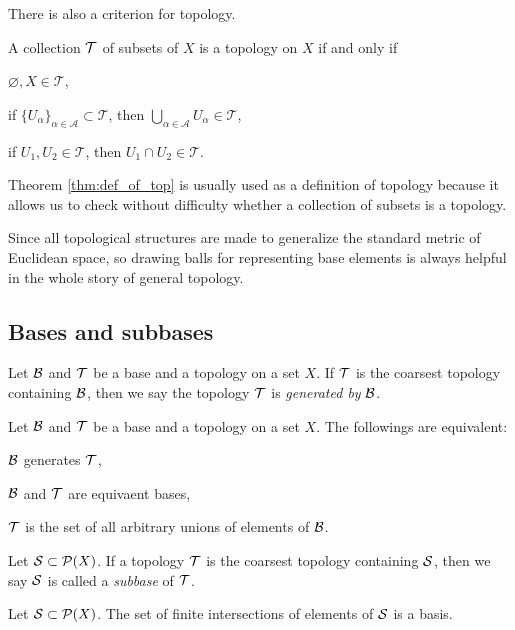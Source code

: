 \documentclass{../crs}
\begin{document}
There is also a criterion for topology.

\begin{thm}\label{thm:def_of_top}
A collection $\mathcal{T}$ of subsets of $X$ is a topology on $X$ if and only if
\begin{cond}
\item $\varnothing,X\in\mathcal{T}$,
\item if $\{U_\alpha\}_{\alpha\in\mathcal{A}}\subset\mathcal{T}$, then $\bigcup_{\alpha\in\mathcal{A}}U_\alpha\in\mathcal{T}$,
\item if $U_1,U_2\in\mathcal{T}$, then $U_1\cap U_2\in\mathcal{T}$.
\end{cond}
\end{thm}
\begin{pf}
\end{pf}
Theorem \ref{thm:def_of_top} is usually used as a definition of topology because it allows us to check without difficulty whether a collection of subsets is a topology.


Since all topological structures are made to generalize the standard metric of Euclidean space, so drawing balls for representing base elements is always helpful in the whole story of general topology.






\subsection{Bases and subbases}

\begin{defn}
Let $\mathcal{B}$ and $\mathcal{T}$ be a base and a topology on a set $X$.
If $\mathcal{T}$ is the coarsest topology containing $\mathcal{B}$, then we say the topology $\mathcal{T}$ is \emph{generated by} $\mathcal{B}$.
\end{defn}
\begin{thm}
Let $\mathcal{B}$ and $\mathcal{T}$ be a base and a topology on a set $X$.
The followings are equivalent:
\begin{cond}
\item $\mathcal{B}$ generates $\mathcal{T}$,
\item $\mathcal{B}$ and $\mathcal{T}$ are equivaent bases,
\item $\mathcal{T}$ is the set of all arbitrary unions of elements of $\mathcal{B}$.
\end{cond}
\end{thm}

\begin{defn}
Let $\mathcal{S}\subset\mathcal{P}(X)$.
If a topology $\mathcal{T}$ is the coarsest topology containing $\mathcal{S}$, then we say $\mathcal{S}$ is called a \emph{subbase} of $\mathcal{T}$.
\end{defn}
\begin{prop}
Let $\mathcal{S}\subset\mathcal{P}(X)$.
The set of finite intersections of elements of $\mathcal{S}$ is a basis.
\end{prop}
\end{document}
